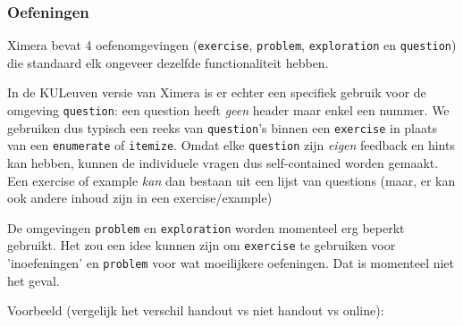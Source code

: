 \documentclass{ximera}
\begin{document}
\subsubsection{Oefeningen}

Ximera bevat 4 oefenomgevingen (\verb|exercise|, \verb|problem|, \verb|exploration| en \verb|question|) die standaard elk ongeveer dezelfde functionaliteit hebben. 

In de KULeuven versie van Ximera is er echter een specifiek gebruik voor de omgeving \verb|question|: een question heeft \textit{geen} header maar enkel een nummer. 
We gebruiken dus typisch een reeks van \verb|question|'s binnen een \verb|exercise| in plaats van een \verb|enumerate| of \verb|itemize|.
Omdat elke \verb|question| zijn \textit{eigen} feedback en hints kan hebben, kunnen de individuele vragen dus self-contained worden gemaakt. Een exercise of example \textit{kan} dan bestaan uit een lijst van questions (maar, er kan ook andere inhoud zijn in een exercise/example)

De omgevingen \verb|problem| en \verb|exploration| worden momenteel erg beperkt gebruikt. Het zou een idee kunnen zijn om \verb|exercise| te gebruiken voor 'inoefeningen' en \verb|problem| voor wat moeilijkere oefeningen. Dat is momenteel niet het geval.

Voorbeeld (vergelijk het verschil handout vs niet handout vs online):
\end{document}
